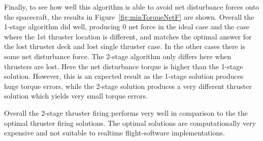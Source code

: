 \documentclass[]{BasiliskReportMemo}
\begin{document}
Finally, to see how well this algorithm is able to avoid net disturbance forces onto the spacecraft, the results in Figure~\ref{fig:minTorqueNetF} are shown.  Overall the 1-stage algorithm did well, producing 0 net force in the ideal case and the case where the 1st thruster location is different, and matches the optimal answer for the lost thruster deck and lost single thruster case.  In the other cases there is some net disturbance force.  The 2-stage algorithm only differs here when thrusters are lost.  Here the net disturbance torque is higher than the 1-stage solution.  However, this is an expected result as the 1-stage solution produces huge torque errors, while the 2-stage solution produces a very different thruster solution which yields very small torque errors. 

Overall the 2-stage thruster firing performs very well in comparison to the the optimal thruster firing solutions.  The optimal solutions are computationally very expensive and not suitable to realtime flight-software implementations.  
\end{document}
